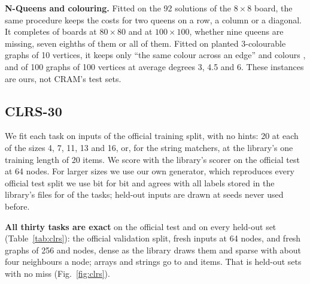 \textbf{N-Queens and colouring.} Fitted on the 92 solutions of the $8\times8$ board, the same procedure keeps the costs
for two queens on a row, a column or a diagonal. It completes  of  boards at $80\times80$ and
at $100\times100$, whether nine queens are missing, seven eighths of them or all of them. Fitted on planted
3-colourable graphs of 10 vertices, it keeps only ``the same colour across an edge'' and colours
,  and  of 100 graphs of 100 vertices at average degrees
3, 4.5 and 6. These instances are ours, not CRAM's test sets.

\subsection{CLRS-30}\label{sec:clrs}

We fit each task on  inputs of the official training split, with no hints: 20 at each of the
sizes 4, 7, 11, 13 and 16, or, for the string matchers, at the library's one training length of 20 items. We score with
the library's scorer on the official test at 64 nodes. For larger sizes we use our own generator, which reproduces every
official test split we use bit for bit and agrees with all  labels stored in the library's files for
 of the tasks; held-out inputs are drawn at seeds never used before.

\textbf{All thirty tasks are exact} on the official test and on every held-out set (Table~\ref{tab:clrs}): the official
validation split, fresh inputs at 64 nodes, and fresh graphs of 256 and  nodes, dense as the library
draws them and sparse with about four neighbours a node; arrays and strings go to  and
 items. That is  held-out sets with no miss (Fig.~\ref{fig:clrs}).

